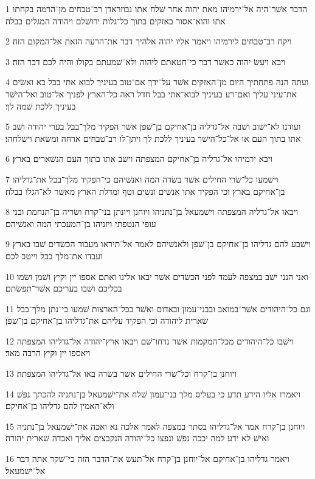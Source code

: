 \par 1 הדבר אשׁר־היה אל־ירמיהו מאת יהוה אחר שׁלח אתו נבוזראדן רב־טבחים מן־הרמה בקחתו אתו והוא־אסור באזקים בתוך כל־גלות ירושׁלם ויהודה המגלים בבלה׃
\par 2 ויקח רב־טבחים לירמיהו ויאמר אליו יהוה אלהיך דבר את־הרעה הזאת אל־המקום הזה׃
\par 3 ויבא ויעשׂ יהוה כאשׁר דבר כי־חטאתם ליהוה ולא־שׁמעתם בקולו והיה לכם דבר הזה׃
\par 4 ועתה הנה פתחתיך היום מן־האזקים אשׁר על־ידך אם־טוב בעיניך לבוא אתי בבל בא ואשׂים את־עיני עליך ואם־רע בעיניך לבוא־אתי בבל חדל ראה כל־הארץ לפניך אל־טוב ואל־הישׁר בעיניך ללכת שׁמה לך׃
\par 5 ועודנו לא־ישׁוב ושׁבה אל־גדליה בן־אחיקם בן־שׁפן אשׁר הפקיד מלך־בבל בערי יהודה ושׁב אתו בתוך העם או אל־כל־הישׁר בעיניך ללכת לך ויתן־לו רב־טבחים ארחה ומשׂאת וישׁלחהו׃
\par 6 ויבא ירמיהו אל־גדליה בן־אחיקם המצפתה וישׁב אתו בתוך העם הנשׁארים בארץ׃
\par 7 וישׁמעו כל־שׂרי החילים אשׁר בשׂדה המה ואנשׁיהם כי־הפקיד מלך־בבל את־גדליהו בן־אחיקם בארץ וכי הפקיד אתו אנשׁים ונשׁים וטף ומדלת הארץ מאשׁר לא־הגלו בבלה׃
\par 8 ויבאו אל־גדליה המצפתה וישׁמעאל בן־נתניהו ויוחנן ויונתן בני־קרח ושׂריה בן־תנחמת ובני עופי הנטפתי ויזניהו בן־המעכתי המה ואנשׁיהם׃
\par 9 וישׁבע להם גדליהו בן־אחיקם בן־שׁפן ולאנשׁיהם לאמר אל־תיראו מעבוד הכשׂדים שׁבו בארץ ועבדו את־מלך בבל וייטב לכם׃
\par 10 ואני הנני ישׁב במצפה לעמד לפני הכשׂדים אשׁר יבאו אלינו ואתם אספו יין וקיץ ושׁמן ושׂמו בכליכם ושׁבו בעריכם אשׁר־תפשׂתם׃
\par 11 וגם כל־היהודים אשׁר־במואב ובבני־עמון ובאדום ואשׁר בכל־הארצות שׁמעו כי־נתן מלך־בבל שׁארית ליהודה וכי הפקיד עליהם את־גדליהו בן־אחיקם בן־שׁפן׃
\par 12 וישׁבו כל־היהודים מכל־המקמות אשׁר נדחו־שׁם ויבאו ארץ־יהודה אל־גדליהו המצפתה ויאספו יין וקיץ הרבה מאד׃
\par 13 ויוחנן בן־קרח וכל־שׂרי החילים אשׁר בשׂדה באו אל־גדליהו המצפתה׃
\par 14 ויאמרו אליו הידע תדע כי בעליס מלך בני־עמון שׁלח את־ישׁמעאל בן־נתניה להכתך נפשׁ ולא־האמין להם גדליהו בן־אחיקם׃
\par 15 ויוחנן בן־קרח אמר אל־גדליהו בסתר במצפה לאמר אלכה נא ואכה את־ישׁמעאל בן־נתניה ואישׁ לא ידע למה יככה נפשׁ ונפצו כל־יהודה הנקבצים אליך ואבדה שׁארית יהודה׃
\par 16 ויאמר גדליהו בן־אחיקם אל־יוחנן בן־קרח אל־תעשׂ את־הדבר הזה כי־שׁקר אתה דבר אל־ישׁמעאל׃

